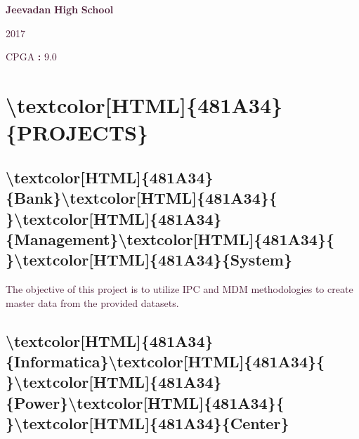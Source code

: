 \documentclass[12pt]{article}%
\begin{document}
%
\begin{flushleft}%
\textcolor[HTML]{481A34}{\textbf{Jeevadan}}\textcolor[HTML]{481A34}{\textbf{ }}\textcolor[HTML]{481A34}{\textbf{High}}\textcolor[HTML]{481A34}{\textbf{ }}\textcolor[HTML]{481A34}{\textbf{School}}%
\end{flushleft}%
\newline%
%
\begin{justify}%
\textcolor[HTML]{481A34}{2017}%
\end{justify}%
\newline%
%
\begin{justify}%
\textcolor[HTML]{481A34}{CPGA}\textcolor[HTML]{481A34}{ }\textcolor[HTML]{481A34}{\textbf{:}}\textcolor[HTML]{481A34}{\textbf{ }}\textcolor[HTML]{481A34}{9.0}%
\end{justify}%
\newline%
%
\section{\textbackslash{}textcolor{[}HTML{]}\{481A34\}\{PROJECTS\}}%
\label{sec:sec33}%

%
\subsection{\textbackslash{}textcolor{[}HTML{]}\{481A34\}\{Bank\}\textbackslash{}textcolor{[}HTML{]}\{481A34\}\{ \}\textbackslash{}textcolor{[}HTML{]}\{481A34\}\{Management\}\textbackslash{}textcolor{[}HTML{]}\{481A34\}\{ \}\textbackslash{}textcolor{[}HTML{]}\{481A34\}\{System\}}%
\label{subsec:subsec34}%

%
\begin{justify}%
\textcolor[HTML]{481A34}{The objective of this project is to utilize IPC and}\textcolor[HTML]{481A34}{ }\textcolor[HTML]{481A34}{MDM}\textcolor[HTML]{481A34}{ }\textcolor[HTML]{481A34}{methodologies}\textcolor[HTML]{481A34}{ }\textcolor[HTML]{481A34}{to}\textcolor[HTML]{481A34}{ }\textcolor[HTML]{481A34}{create}\textcolor[HTML]{481A34}{ }\textcolor[HTML]{481A34}{master}\textcolor[HTML]{481A34}{ }\textcolor[HTML]{481A34}{data}\textcolor[HTML]{481A34}{ }\textcolor[HTML]{481A34}{from}\textcolor[HTML]{481A34}{ }\textcolor[HTML]{481A34}{the}\textcolor[HTML]{481A34}{ }\textcolor[HTML]{481A34}{provided}\textcolor[HTML]{481A34}{ }\textcolor[HTML]{481A34}{datasets.}%
\end{justify}%
\newline%
%
\subsection{\textbackslash{}textcolor{[}HTML{]}\{481A34\}\{Informatica\}\textbackslash{}textcolor{[}HTML{]}\{481A34\}\{ \}\textbackslash{}textcolor{[}HTML{]}\{481A34\}\{Power\}\textbackslash{}textcolor{[}HTML{]}\{481A34\}\{ \}\textbackslash{}textcolor{[}HTML{]}\{481A34\}\{Center\}}%
\label{subsec:subsec36}%
\end{document}
